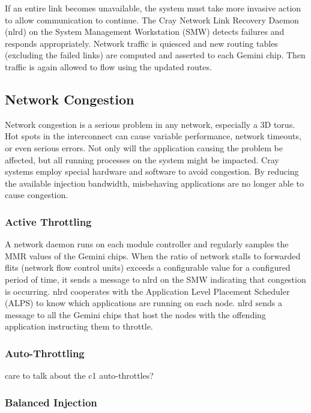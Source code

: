 \documentclass[10pt, conference, compsocconf]{IEEEtran}
\begin{document}
If an entire link becomes unavailable, the system must take more invasive
action to allow communication to continue.  The Cray Network Link Recovery
Daemon (nlrd) on the System Management Workstation (SMW) detects failures and
responds appropriately.  Network traffic is quiesced and new routing tables
(excluding the failed links) are computed and asserted to each Gemini chip.
Then traffic is again allowed to flow using the updated routes.

\subsection{Network Congestion}

Network congestion is a serious problem in any network, especially a 3D torus.
Hot spots in the interconnect can cause variable performance, network timeouts,
or even serious errors.  Not only will the application causing the problem be
affected, but all running processes on the system might be impacted.  Cray
systems employ special hardware and software to avoid congestion.  By reducing
the available injection bandwidth, misbehaving applications are no longer able
to cause congestion.

\subsubsection{Active Throttling}

A network daemon runs on each module controller and regularly samples the MMR
values of the Gemini chips.  When the ratio of network stalls to forwarded
flits (network flow control units) exceeds a configurable value for a
configured period of time, it sends a message to nlrd on the SMW indicating
that congestion is occurring.  nlrd cooperates with the Application Level
Placement Scheduler (ALPS) to know which applications are running on each node.
nlrd sends a message to all the Gemini chips that host the nodes with the
offending application instructing them to throttle.

\subsubsection{Auto-Throttling}

care to talk about the c1 auto-throttles?

\subsubsection{Balanced Injection}
\end{document}
